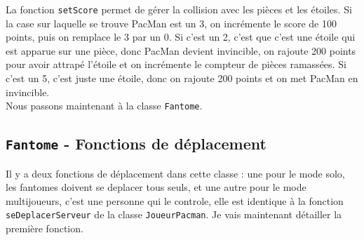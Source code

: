	La fonction \texttt{setScore} permet de gérer la collision avec les pièces et les étoiles. Si la case sur laquelle se trouve PacMan est un 3, on incrémente le score de 100 points, puis on
	remplace le 3 par un 0. Si c'est un 2, c'est que c'est une étoile qui est apparue sur une pièce, donc PacMan devient invincible, on rajoute 200 points pour avoir attrapé l'étoile et on 
	incrémente le compteur de pièces ramassées. Si c'est un 5, c'est juste une étoile, donc on rajoute 200 points et on met PacMan en invincible.\\
	
	Nous passons maintenant à la classe \texttt{Fantome}.
	
      \subsection*{\texttt{Fantome} - Fonctions de déplacement}
	Il y a deux fonctions de déplacement dans cette classe : une pour le mode solo, les fantomes doivent se deplacer tous seuls, et une autre pour le mode multijoueurs, c'est une personne qui 
	le controle, elle est identique à la fonction \texttt{seDeplacerServeur} de la classe \texttt{JoueurPacman}. Je vais maintenant détailler la première fonction.\\
	
    
    
    
    
    
    
    
    